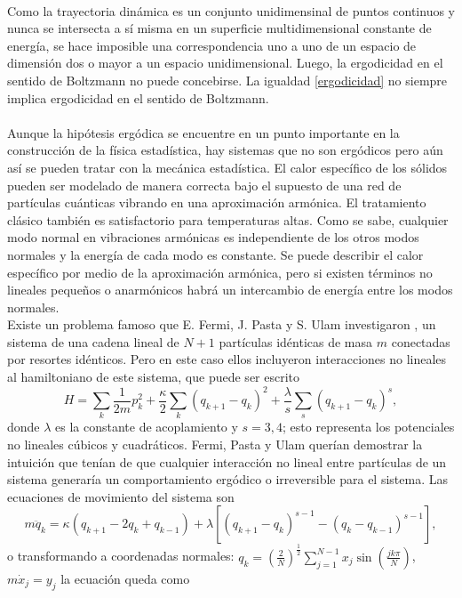 \\ 
Como la trayectoria dinámica es un conjunto unidimensinal de puntos continuos y nunca se intersecta a sí misma en un superficie multidimensional constante de energía, se hace imposible una correspondencia uno a uno de un espacio de dimensión dos o mayor a un espacio unidimensional. Luego, la ergodicidad en el sentido de Boltzmann no puede concebirse. La igualdad \ref{ergodicidad} no siempre implica ergodicidad en el sentido de Boltzmann.
\\
\\
Aunque la hipótesis ergódica se encuentre en un punto importante en la construcción de la física estadística, hay sistemas que no son ergódicos pero aún así se pueden tratar con la mecánica estadística. El calor específico de los sólidos pueden ser modelado de manera correcta bajo el supuesto de una red de partículas cuánticas vibrando en una aproximación armónica.  El tratamiento clásico también es satisfactorio para temperaturas altas. Como se sabe, cualquier modo normal en vibraciones armónicas es independiente de los otros modos normales y la energía de cada modo es constante. Se puede describir el calor específico por medio de la aproximación armónica, pero si existen términos no lineales pequeños o anarmónicos habrá un intercambio de energía entre los modos normales. 
\\
Existe un problema famoso que E. Fermi, J. Pasta y S. Ulam investigaron \cite{FermiPastaUlam}, un sistema de una cadena lineal de $N+1$ partículas idénticas de masa $m$ conectadas por resortes idénticos. Pero en este caso ellos incluyeron interacciones no lineales al hamiltoniano de este sistema, que puede ser escrito 
\begin{equation}
H= \sum_{k} \frac{1}{2m} p_{k}^{2} +\frac{\kappa}{2}\sum_{k} (q_{k+1}-q_{k})^{2}+\frac{\lambda}{s}\sum_{s} (q_{k+1}-q_{k})^{s},
\end{equation}
donde $\lambda$ es la constante de acoplamiento y $s=3,4$; esto representa los potenciales no lineales cúbicos y cuadráticos. Fermi, Pasta y Ulam querían demostrar la intuición que tenían de que cualquier interacción no lineal entre partículas de un sistema generaría un comportamiento ergódico o irreversible para el sistema. Las ecuaciones de movimiento del sistema son
\begin{equation}
m \ddot{q}_{k}= \kappa (q_{k+1}-2q_{k}+q_{k-1})+ \lambda[(q_{k+1}-q_{k})^{s-1}-(q_{k}-q_{k-1})^{s-1}],
\end{equation} 
o transformando a coordenadas normales: $q_{k}=(\frac{2}{N})^{\frac{1}{2}} \sum_{j=1}^{N-1}x_{j} \sin (\frac{jk \pi }{N})$, $m\dot{x}_{j}=y_{j}$ la ecuación queda como
